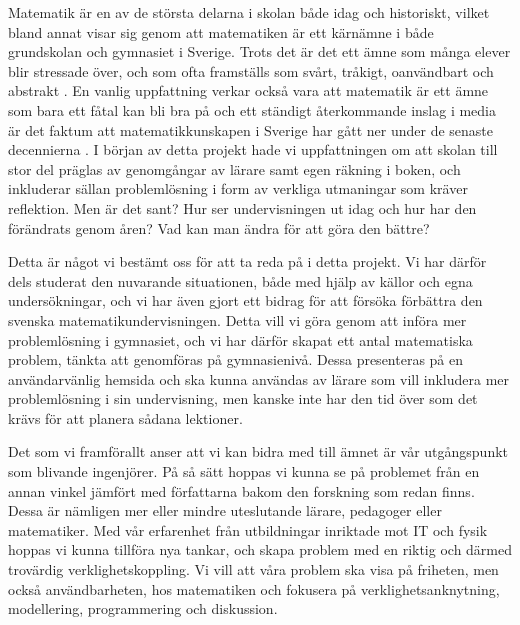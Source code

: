 \label{kapitel1} \textcolor{lila}{Matematik är en av de största delarna i skolan både idag och historiskt, vilket bland annat visar sig genom att matematiken är ett kärnämne i både grundskolan och gymnasiet i Sverige. Trots det är det ett ämne som många elever blir stressade över, och som ofta framställs som svårt, tråkigt, oanvändbart och abstrakt \cite{Ignacio&Barona}. En vanlig uppfattning verkar också vara att matematik är ett ämne som bara ett fåtal kan bli bra på \cite{Skolverket03} och ett ständigt återkommande inslag i media är det faktum att matematikkunskapen i Sverige har gått ner under de senaste decennierna \cite{CompareOECD}.
I början av detta projekt hade vi uppfattningen om att skolan till stor del präglas av genomgångar av lärare samt egen räkning i boken, och inkluderar sällan problemlösning i form av verkliga utmaningar som kräver reflektion. Men är det sant? Hur ser undervisningen ut idag och hur har den förändrats genom åren? Vad kan man ändra för att göra den bättre?}

\textcolor{lila}{Detta är något vi bestämt oss för att ta reda på i detta projekt. Vi har därför dels studerat den nuvarande situationen, både med hjälp av källor och egna undersökningar, och vi har även gjort ett bidrag för att försöka förbättra den svenska matematikundervisningen. Detta vill vi göra genom att införa mer problemlösning i gymnasiet, och vi har därför skapat ett antal matematiska problem, tänkta att genomföras på gymnasienivå. Dessa presenteras på en användarvänlig hemsida och ska kunna användas av lärare som vill inkludera mer problemlösning i sin undervisning, men kanske inte har den tid över som det krävs för att planera sådana lektioner.}

\textcolor{lila}{Det som vi framförallt anser att vi kan bidra med till ämnet är vår utgångspunkt som blivande ingenjörer. På så sätt hoppas vi kunna se på problemet från en annan vinkel jämfört med författarna bakom den forskning som redan finns. Dessa är nämligen mer eller mindre uteslutande lärare, pedagoger eller matematiker. Med vår erfarenhet från utbildningar inriktade mot IT och fysik hoppas vi kunna tillföra nya tankar, och skapa problem med en riktig och därmed trovärdig verklighetskoppling. Vi vill att våra problem ska visa på friheten, men också användbarheten, hos matematiken och fokusera på verklighetsanknytning, modellering, programmering och diskussion.}

